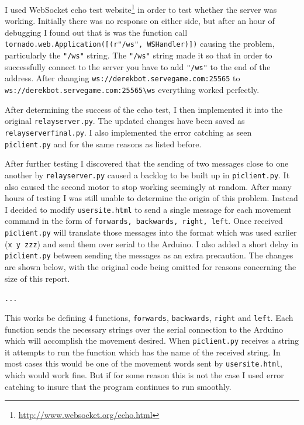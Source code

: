 \documentclass[]{report}   %
\begin{document}
						I used WebSocket echo test website\footnote{\url{http://www.websocket.org/echo.html}} in order to test whether the server was working.
						Initially there was no response on either side, but after an hour of debugging I found out that is was the function call
						\lstinline{tornado.web.Application([(r"/ws", WSHandler)])} causing the problem, particularly the \lstinline{"/ws"} string.
						The \lstinline{"/ws"} string made it so that in order to successfully connect to the server you have to add \lstinline{"/ws"} to the
						end of the address. After changing \lstinline{ws://derekbot.servegame.com:25565} to \lstinline{ws://derekbot.servegame.com:25565\ws}
						everything worked perfectly.
						
						After determining the success of the echo test, I then implemented it into the original \lstinline{relayserver.py}. The updated changes
						have been saved as \lstinline{relayserverfinal.py}. I also implemented the error catching as seen \lstinline{piclient.py} and for the same
						reasons as listed before.
						
						
						

						After further testing I discovered that the sending of two messages close to one another by \lstinline{relayserver.py} caused a backlog
						to be built up in \lstinline{piclient.py}. It also caused the second motor to stop working seemingly at random. After many hours of
						testing I was still unable to determine the origin of this problem. Instead I decided to modify \lstinline{usersite.html} to send a
						single message for each movement command in the form of \lstinline{forwards, backwards, right, left}. Once received
						\lstinline{piclient.py} will translate those messages into the format which was used earlier (\lstinline{x y zzz}) and send them
						over serial to the Arduino. I also added a short delay in \lstinline{piclient.py} between sending the messages as an extra precaution.
						The changes are shown below, with the original code being omitted for reasons concerning the size of this report.
						
						
						\lstinline{...}
						
						
						This works be defining 4 functions, \lstinline{forwards}, \lstinline{backwards}, \lstinline{right} and \lstinline{left}. Each function
						sends the necessary strings over the serial connection to the Arduino which will accomplish the movement desired. When
						\lstinline{piclient.py} receives a string it attempts to run the function which has the name of the received string. In most cases this
						would be one of the movement words sent by \lstinline{usersite.html}, which would work fine. But if for some reason this is not the case
						I used error catching to insure that the program continues to run smoothly.
						
\end{document}
